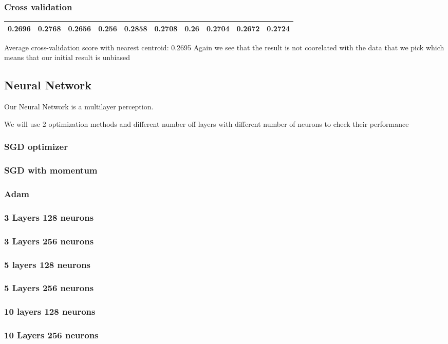 \documentclass{article}
\begin{document}
\subsubsection{Cross validation}
\begin{tabular}{|c|c|c|c|c|c|c|c|c|c|}
\hline
0.2696 & 0.2768 & 0.2656 & 0.256 &  0.2858 & 0.2708 &  0.26 &   0.2704 &  0.2672 & 0.2724 \\
\hline
\end{tabular}

Average cross-validation score with nearest centroid: 0.2695
Again we see that the result is not coorelated with the data that we pick which means that our initial result is unbiased
\subsection{Neural Network} 

Our Neural Network is a multilayer perception. 

We will use 2 optimization methods and different number off layers with different number of neurons to check their performance

\subsubsection{SGD optimizer}
\subsubsection{SGD with momentum}
\subsubsection{Adam}
\subsubsection{3 Layers 128 neurons}
\subsubsection{3 Layers 256 neurons}
\subsubsection{5 layers 128 neurons}
\subsubsection{5 Layers 256 neurons}
\subsubsection{10 layers 128 neurons}
\subsubsection{10 Layers 256 neurons}

\pagebreak


\end{document}
